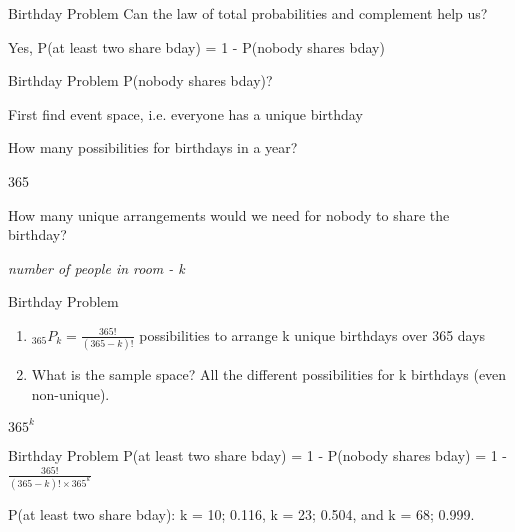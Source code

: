 \documentclass[presentation]{beamer}
\begin{document}
\begin{frame}[label={sec:orgb8ef819}]{Birthday Problem}
Can the law of total probabilities and complement help us?

\pause

Yes, P(at least two share bday) = 1 - P(nobody shares bday)
\end{frame}

\begin{frame}[label={sec:org06ba84d}]{Birthday Problem}
P(nobody shares bday)?

First find event space, i.e. everyone has a unique birthday

\pause

How many possibilities for birthdays in a year?

\pause

365

\pause

How many unique arrangements would we need for nobody to share the birthday?

\emph{number of people in room - k}
\end{frame}

\begin{frame}[label={sec:orgac1e74a}]{Birthday Problem}
\begin{enumerate}
\item \(_{365}P_{k} = \frac{365!}{(365-k)!}\) possibilities to arrange k unique birthdays over 365 days

\item What is the sample space? \alert{All the different possibilities for k birthdays (even non-unique).}
\end{enumerate}

\pause
\(365^{k}\)
\end{frame}

\begin{frame}[label={sec:org61c1cf3}]{Birthday Problem}
P(at least two share bday) = 1 - P(nobody shares bday) = 1 - \(\frac{365!}{(365-k)! \times 365^{k}}\)

\pause

P(at least two share bday): k = 10; 0.116, k = 23; 0.504, and k = 68; 0.999.
\end{frame}
\end{document}
